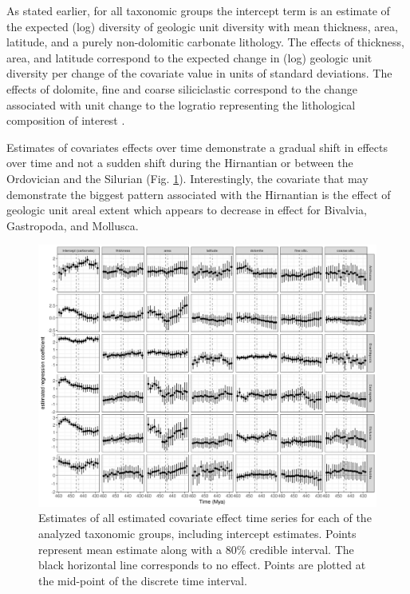 \documentclass[12pt,letterpaper]{article}
\begin{document}
As stated earlier, for all taxonomic groups the intercept term is an estimate of the expected (log) diversity of geologic unit diversity with mean thickness, area, latitude, and a purely non-dolomitic carbonate lithology. The effects of thickness, area, and latitude correspond to the expected change in (log) geologic unit diversity per change of the covariate value in units of standard deviations. The effects of dolomite, fine and coarse siliciclastic correspond to the change associated with unit change to the logratio representing the lithological composition of interest \citep{Hron2012}.

Estimates of covariates effects over time demonstrate a gradual shift in effects over time and not a sudden shift during the Hirnantian or between the Ordovician and the Silurian (Fig. \ref{fig:time_cov}). Interestingly, the covariate that may demonstrate the biggest pattern associated with the Hirnantian is the effect of geologic unit areal extent which appears to decrease in effect for Bivalvia, Gastropoda, and Mollusca. 
\begin{figure}[ht]
  \centering
  \includegraphics[width=\textwidth,height=0.5\textheight,keepaspectratio=true]{figure/cov_time_diversity}
  \caption{Estimates of all estimated covariate effect time series for each of the analyzed taxonomic groups, including intercept estimates. Points represent mean estimate along with a 80\% credible interval. The black horizontal line corresponds to no effect. Points are plotted at the mid-point of the discrete time interval.}
  \label{fig:time_cov}
\end{figure}
\end{document}
